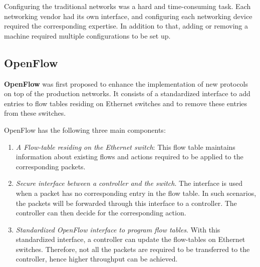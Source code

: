 Configuring the traditional networks was a hard and time-consuming task. 
Each networking vendor had its own interface, and configuring each 
networking device required the corresponding expertise. In addition to
that, adding or removing a machine required multiple configurations to be set up.





\subsection{OpenFlow}
\textbf{OpenFlow} was first proposed to enhance the implementation of 
new protocols on top of the production networks. It consists of a standardized 
interface to add entries to flow tables residing on Ethernet 
switches and to remove these entries from these 
switches.\cite{mckeown2008openflow}

OpenFlow has the following three main components:
\begin{enumerate}
    \item \emph{A Flow-table residing on the Ethernet switch}: This flow table 
    maintains information about existing flows and actions required
    to be applied to the corresponding packets.
    \item \emph{Secure interface between a controller and the switch}.
    The interface is used when a packet has no corresponding 
    entry in the flow table. In such scenarios, the packets will 
    be forwarded through this interface to a controller. The controller
    can then decide for the corresponding action.
    \item \emph{Standardized OpenFlow interface to program flow tables}. 
    With this standardized interface, a controller can update the flow-tables 
    on Ethernet switches. Therefore, not all the packets are required to 
    be transferred to the controller, hence higher throughput can be achieved. 
\end{enumerate}


